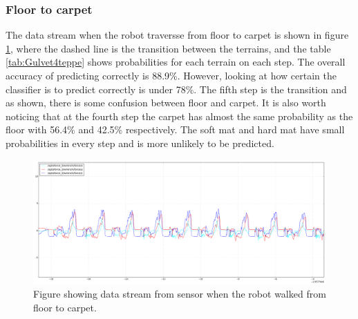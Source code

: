 \documentclass[USenglish]{ifimaster}  %
\begin{document}
\subsubsection{Floor to carpet}
The data stream when the robot traversse from floor to carpet is shown in figure \ref{fig:gulvet4teppegraf}, where the dashed line is the transition between the terrains, and the table \ref{tab:Gulvet4teppe} shows probabilities for each terrain on each step. The overall accuracy of predicting correctly is 88.9\%. However, looking at how certain the classifier is to predict correctly is under 78\%. The fifth step is the transition and as shown, there is some confusion between floor and carpet. It is also worth noticing that at the fourth step the carpet has almost the same probability as the floor with 56.4\% and 42.5\% respectively. The soft mat and hard mat have small probabilities in every step and is more unlikely to be predicted.
	
	\begin{figure}[h]
		\centering
		\includegraphics[width=\textwidth,height=\textheight,keepaspectratio]{Figures/Gulvet4Teppe2}
		\caption{Figure showing data stream from sensor when the robot walked from floor to carpet.}
		\label{fig:gulvet4teppegraf}
	\end{figure}
	
\end{document}
